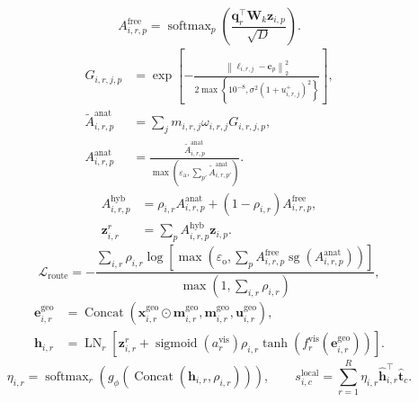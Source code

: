 \documentclass{article}
\begin{document}
\begin{equation}
A^{\mathrm{free}}_{i,r,p}
=
\operatorname{softmax}_{p}\!\left(
\frac{\mathbf{q}_r^{\top}\mathbf{W}_k\mathbf{z}_{i,p}}
{\sqrt{D}}
\right).
\tag{9}
\end{equation}
\begin{equation}
\begin{aligned}
G_{i,r,j,p}
&=
\exp\!\left[
-\frac{
\left\|\boldsymbol{\ell}_{i,r,j}-\mathbf{c}_p\right\|_2^2
}{
2\max\!\left\{
10^{-8},
\sigma^2\left(1+u^+_{i,r,j}\right)^2
\right\}
}
\right], \\
\widetilde{A}^{\mathrm{anat}}_{i,r,p}
&=
\sum_j
m_{i,r,j}\omega_{i,r,j}G_{i,r,j,p}, \\
A^{\mathrm{anat}}_{i,r,p}
&=
\frac{
\widetilde{A}^{\mathrm{anat}}_{i,r,p}
}{
\max\!\left(
\varepsilon_{\mathrm{a}},
\sum_{p'}\widetilde{A}^{\mathrm{anat}}_{i,r,p'}
\right)
}.
\end{aligned}
\tag{10}
\end{equation}
\begin{equation}
\begin{aligned}
A^{\mathrm{hyb}}_{i,r,p}
&=
\rho_{i,r}A^{\mathrm{anat}}_{i,r,p}
+\left(1-\rho_{i,r}\right)A^{\mathrm{free}}_{i,r,p}, \\
\mathbf{z}^{r}_{i,r}
&=
\sum_{p}A^{\mathrm{hyb}}_{i,r,p}\mathbf{z}_{i,p}.
\end{aligned}
\tag{11}
\end{equation}
\begin{equation}
\mathcal{L}_{\mathrm{route}}
=
-\frac{
\sum_{i,r}\rho_{i,r}
\log\!\left[
\max\!\left(
\varepsilon_{\mathrm{o}},
\sum_p
A^{\mathrm{free}}_{i,r,p}
\operatorname{sg}\!\left(A^{\mathrm{anat}}_{i,r,p}\right)
\right)
\right]
}{
\max\!\left(1,\sum_{i,r}\rho_{i,r}\right)
},
\tag{12}
\end{equation}
\begin{equation}
\begin{aligned}
\mathbf{e}_{i,r}^{\mathrm{geo}}
&=
\operatorname{Concat}\!\left(
\mathbf{x}_{i,r}^{\mathrm{geo}}\odot\mathbf{m}_{i,r}^{\mathrm{geo}},
\mathbf{m}_{i,r}^{\mathrm{geo}},
\mathbf{u}_{i,r}^{\mathrm{geo}}
\right), \\
\mathbf{h}_{i,r}
&=
\operatorname{LN}_r\!\left[
\mathbf{z}^{r}_{i,r}
+\operatorname{sigmoid}\!\left(a_r^{\mathrm{vis}}\right)\rho_{i,r}
\tanh\!\left(f_r^{\mathrm{vis}}(\mathbf{e}_{i,r}^{\mathrm{geo}})\right)
\right].
\end{aligned}
\tag{13}
\end{equation}
\begin{equation}
\eta_{i,r}
=
\operatorname{softmax}_{r}\!\left(
g_{\phi}\!\left(
\operatorname{Concat}(\mathbf{h}_{i,r},\rho_{i,r})
\right)
\right),
\qquad
s^{\mathrm{local}}_{i,c}
=
\sum_{r=1}^{R}
\eta_{i,r}
\widehat{\mathbf{h}}_{i,r}^{\top}
\widehat{\mathbf{t}}_c.
\tag{14}
\end{equation}
\end{document}
